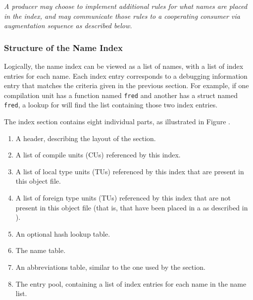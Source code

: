 \textit{A producer may choose to implement additional rules for what
names are placed in the index, and may communicate those rules to
a cooperating consumer via 
\bb 
augmentation sequence as
\eb
described below.}

\subsubsection{Structure of the Name Index}
\label{chap:structureofthenametindex}
Logically, the name index can be viewed as a list of names, 
with a list of index entries for each name. Each index entry 
corresponds to a debugging information entry 
that matches the criteria given in the previous section. For
example, if one compilation unit has a function named \texttt{fred} 
and another has a struct named \texttt{fred}, a lookup for 
 will find the list containing those two index 
entries.

The index section contains eight individual parts, as illustrated in 
Figure .
\begin{enumerate}
\item A header, describing the layout of the section.

\item A list of compile units (CUs) referenced by this index.

\item A list of local type units (TUs) referenced by this index
    that are present in this object file.

\item A list of foreign type units (TUs) referenced by this index
    that are not present in this object file (that is, that have
    been placed in a \splitDWARFobjectfile{} as described in
    ).

\item An optional hash lookup table.

\item The name table.

\item An abbreviations table, similar to the one used by the
    \dotdebuginfo{} section.

\item The entry pool, containing a list of index entries for each
    name in the name list.
\end{enumerate}

